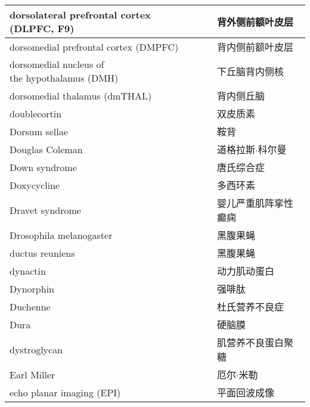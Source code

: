 \begin{longtable}{lll}
	\midrule
	dorsolateral prefrontal cortex (DLPFC, F9)     &&  背外侧前额叶皮层  \\
	
	\midrule
	dorsomedial prefrontal cortex (DMPFC)     &&  背内侧前额叶皮层  \\
	
	\midrule
	\makecell[l]{dorsomedial nucleus of \\the hypothalamus (DMH)}    &&  下丘脑背内侧核  \\
	
	\midrule
	dorsomedial thalamus (dmTHAL)     &&  背内侧丘脑  \\
	
	\midrule
	doublecortin     &&  双皮质素  \\
	
	\midrule
	Dorsum sellae     &&  鞍背  \\
	
	\midrule
	Douglas Coleman     &&  道格拉斯$\cdot$科尔曼  \\
	
	\midrule
	Down syndrome     &&  唐氏综合症  \\
	
	\midrule
	Doxycycline     &&  多西环素  \\
	
	\midrule
	Dravet syndrome     &&  婴儿严重肌阵挛性癫痫  \\
	
	\midrule
	Drosophila melanogaster     &&  黑腹果蝇  \\
	
	\midrule
	ductus reuniens     &&  黑腹果蝇  \\
	
	\midrule
	dynactin     &&  动力肌动蛋白  \\
	
	\midrule
	Dynorphin     &&  强啡肽  \\
	
	\midrule
	Duchenne     &&  杜氏营养不良症  \\
	
	\midrule
	Dura     &&  硬脑膜  \\
	
	\midrule
	dystroglycan     &&  肌营养不良蛋白聚糖  \\
	
	\midrule
	Earl Miller     &&  厄尔$\cdot$米勒  \\
	
	\midrule
	echo planar imaging (EPI)     &&  平面回波成像  \\
	

\end{longtable}
